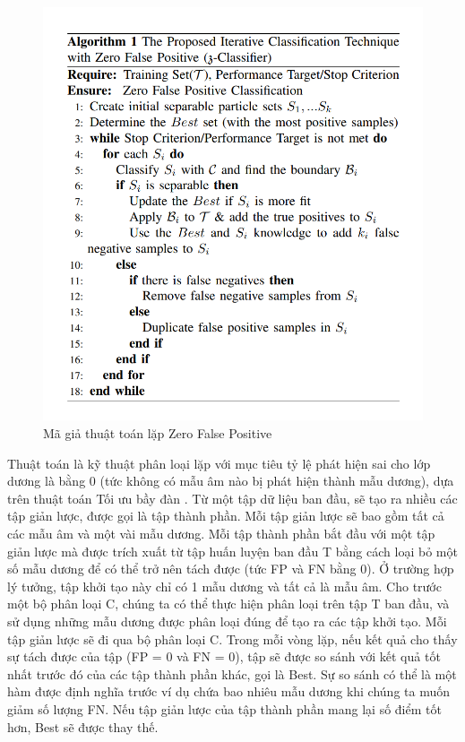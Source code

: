 \documentclass[./../main.tex]{subfiles}
\begin{document}
\begin{figure}[ht!]
	\includegraphics[width=\linewidth]{./images/algorithm_zfp.png}
	\caption{Mã giả thuật toán lặp Zero False Positive}
	\label{fig:algorithm}
\end{figure}
Thuật toán là kỹ thuật phân loại lặp với mục tiêu tỷ lệ phát hiện sai cho lớp dương là bằng 0 (tức không có mẫu âm nào bị phát hiện thành mẫu dương), dựa trên thuật toán Tối ưu bầy đàn \cite{swarm}. Từ một tập dữ liệu ban đầu, sẽ tạo ra nhiều các tập giản lược, được gọi là tập thành phần. Mỗi tập giản lược sẽ bao gồm tất cả các mẫu âm và một vài mẫu dương.
Mỗi tập thành phần bắt đầu với một tập giản lược mà được trích xuất từ tập huấn luyện ban đầu T bằng cách loại bỏ một số mẫu dương để có thể trở nên tách được (tức FP và FN bằng 0). Ở trường hợp lý tưởng, tập khởi tạo này chỉ có 1 mẫu dương và tất cả là mẫu âm. Cho trước một bộ phân loại C, chúng ta có thể thực hiện phân loại trên tập T ban đầu, và sử dụng những mẫu dương được phân loại đúng để tạo ra các tập khởi tạo.
Mỗi tập giản lược sẽ đi qua bộ phân loại C. Trong mỗi vòng lặp, nếu kết quả cho thấy sự tách được của tập (FP = 0 và FN = 0), tập sẽ được so sánh với kết quả tốt nhất trước đó của các tập thành phần khác, gọi là Best. Sự so sánh có thể là một hàm được định nghĩa trước ví dụ chứa bao nhiêu mẫu dương khi chúng ta muốn giảm số lượng FN. Nếu tập giản lược của tập thành phần mang lại số điểm tốt hơn, Best sẽ được thay thế.
\end{document}
